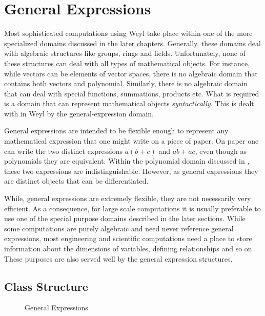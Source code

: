 \chapter{General Expressions}
\label{General:Chap}

Most sophisticated computations using Weyl take place within one of
the more specialized domains discussed in the later chapters.
Generally, these domains deal with algebraic structures like groups,
rings and fields.  Unfortunately, none of these structures can deal
with all types of mathematical objects. For instance, while vectors
can be elements of vector spaces, there is no algebraic domain that
contains both vectors and polynomial.  Similarly, there is no
algebraic domain that can deal with special functions, summations,
products etc. What is required is a domain that can represent
mathematical objects {\em syntactically}.  This is dealt with in Weyl
by the general-expression domain.
  
General expressions are intended to be flexible enough to represent
any mathematical expression that one might write on a piece of
paper. On paper one can write the two distinct expressions $a(b+c)$
and $ab + ac$, even though as polynomials they are equivalent.  Within
the polynomial domain discussed in , these
two expressions are indistinguishable. However, as general expressions
they are distinct objects that can be differentiated.
  
While, general expressions are extremely flexible, they are not
necessarily very efficient. As a consequence, for large scale
computations it is usually preferable to use one of the special
purpose domains described in the later sections. While some
computations are purely algebraic and need never reference general
expressions, most engineering and scientific computations need a place
to store information about the dimensions of variables, defining
relationships and so on. These purposes are also served well by the
general expression structures.
  
  
\section{Class Structure}
\label{ClassStruct:Gen:Sec}

\begin{figure}
\begin{center}
\end{center}
\caption{General Expressions\label{GeneralExpression:Fig}}
\end{figure}

